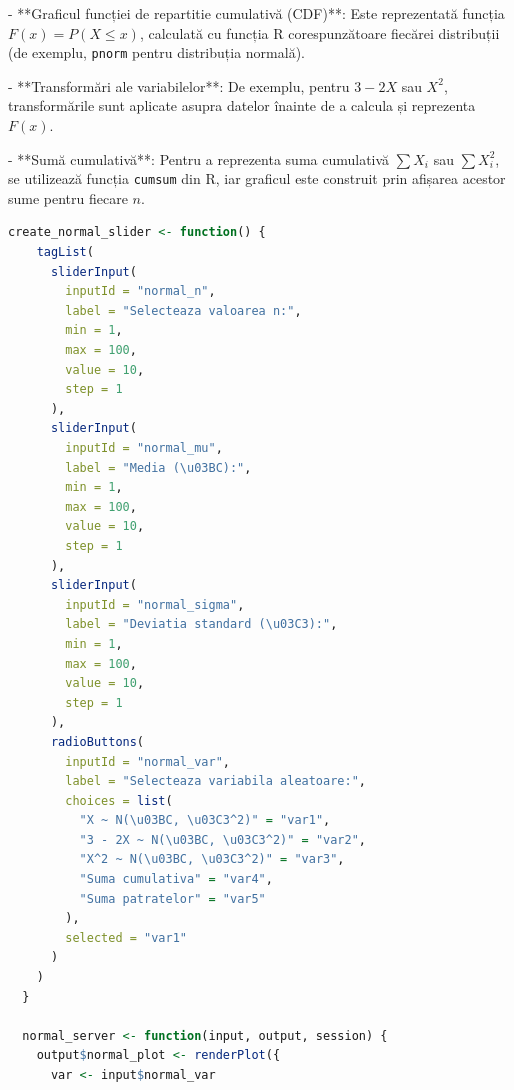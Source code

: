 \documentclass[a4paper,11pt]{article}
\begin{document}
- **Graficul funcției de repartitie cumulativă (CDF)**: Este reprezentată funcția \( F(x) = P(X \leq x) \), calculată cu funcția R corespunzătoare fiecărei distribuții (de exemplu, \texttt{pnorm} pentru distribuția normală).
  
- **Transformări ale variabilelor**: De exemplu, pentru \( 3 - 2X \) sau \( X^2 \), transformările sunt aplicate asupra datelor înainte de a calcula și reprezenta \( F(x) \).
  
- **Sumă cumulativă**: Pentru a reprezenta suma cumulativă \( \sum X_i \) sau \( \sum X_i^2 \), se utilizează funcția \texttt{cumsum} din R, iar graficul este construit prin afișarea acestor sume pentru fiecare \( n \).

\begin{lstlisting}[language=R]
  create_normal_slider <- function() {
    tagList(
      sliderInput(
        inputId = "normal_n",
        label = "Selecteaza valoarea n:",
        min = 1,
        max = 100,
        value = 10,
        step = 1
      ),
      sliderInput(
        inputId = "normal_mu",
        label = "Media (\u03BC):",
        min = 1,
        max = 100,
        value = 10,
        step = 1
      ),
      sliderInput(
        inputId = "normal_sigma",
        label = "Deviatia standard (\u03C3):",
        min = 1,
        max = 100,
        value = 10,
        step = 1
      ),
      radioButtons(
        inputId = "normal_var",
        label = "Selecteaza variabila aleatoare:",
        choices = list(
          "X ~ N(\u03BC, \u03C3^2)" = "var1",
          "3 - 2X ~ N(\u03BC, \u03C3^2)" = "var2",
          "X^2 ~ N(\u03BC, \u03C3^2)" = "var3",
          "Suma cumulativa" = "var4",
          "Suma patratelor" = "var5"
        ),
        selected = "var1"
      )
    )
  }
  
  normal_server <- function(input, output, session) {
    output$normal_plot <- renderPlot({
      var <- input$normal_var
      

\end{lstlisting}
\end{document}
